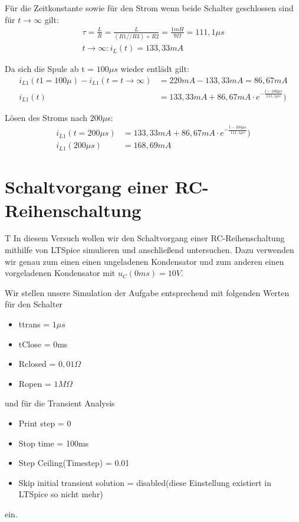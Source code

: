 \documentclass{article}
\begin{document}
Für die Zeitkonstante sowie für den Strom wenn beide Schalter geschlossen sind für $t \rightarrow \infty$ gilt:
\begin{align*}
  \tau = \frac{L}{R} = \frac{L}{(R1//R3)+R2} = \frac{1mH}{9\Omega} = 111,1\mu s\\
  t\rightarrow\infty : i_L(t) = 133,33mA
\end{align*}

Da sich die Spule ab t = $100\mu s$ wieder entlädt gilt:
\begin{align*}
  i_{L1}(t1=100\mu) - i_{L1}(t=t\rightarrow \infty) &= 220mA - 133,33mA = 86,67mA\\
  i_{L1}(t) &= 133,33mA + 86,67mA\cdot e^{-\frac{t-100\mu s}{111,1\mu s}})
\end{align*}


Lösen des Stroms nach $200\mu$s:
\begin{align*}
  i_{L1}(t=200\mu s) &= 133,33mA + 86,67mA\cdot e^{-\frac{t-100\mu s}{111,1\mu s}})\\
  i_{L1}(200\mu s) &= 168,69mA
\end{align*}

\newpage
\section{Schaltvorgang einer RC-Reihenschaltung}

\begin{task}
  T
  In diesem Versuch wollen wir den Schaltvorgang einer RC-Reihenschaltung mithilfe von LTSpice simulieren und anschließend untersuchen. Dazu verwenden wir genau zum einen einen ungeladenen Kondensator und zum anderen einen vorgeladenen Kondensator mit $u_{C}(0ms) = 10V$.
\end{task}

Wir stellen unsere Simulation der Aufgabe entsprechend mit folgenden Werten für den Schalter
\begin{itemize}
  \item ttrans = $1\mu s$
  \item tClose = 0ms
  \item Rclosed = $0,01\Omega$
  \item Ropen = $1M\Omega$
\end{itemize}
und für die Transient Analysis
\begin{itemize}
  \item Print step = 0
  \item Stop time = 100ms
  \item Step Ceiling(Timestep) = 0.01
  \item Skip initial transient solution = disabled(diese Einstellung existiert in LTSpice so nicht mehr)
\end{itemize}
ein.
\end{document}
